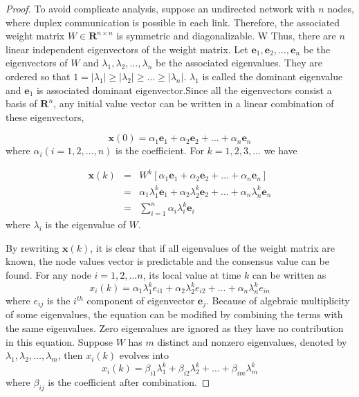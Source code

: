 \begin{proof}
To avoid complicate analysis, suppose an undirected network with $n$
nodes, where duplex communication is possible in each link. Therefore,
the associated weight matrix $W\in\mathbf{R}^{n\times n}$ is symmetric
and diagonalizable. W Thus, there are $n$ linear independent eigenvectors
of the weight matrix. Let $\mathbf{e}_{1},\mathbf{e}_{2},\ldots,\mathbf{e}_{n}$
be the eigenvectors of $W$ and $\lambda_{1},\lambda_{2},\ldots,\lambda_{n}$
be the associated eigenvalues. They are ordered so that $1=\left|\lambda_{1}\right|\geq\left|\lambda_{2}\right|\geq\ldots\geq\left|\lambda_{n}\right|$.
$\lambda_{1}$ is called the dominant eigenvalue and $\mathbf{e}_{1}$
is associated dominant eigenvector.Since all the eigenvectors consist
a basis of $\mathbf{R}^{n}$, any initial value vector can be written
in a linear combination of these eigenvectors, 

\begin{equation}
\mathbf{x}\left(0\right)=\alpha_{1}\mathbf{e}_{1}+\alpha_{2}\mathbf{e}_{2}+\ldots+\alpha_{n}\mathbf{e}_{n}
\end{equation}
where $\alpha_{i}(i=1,2,\ldots,n)$ is the coefficient. For $k=1,2,3,...$
we have

\begin{eqnarray}
\mathbf{x}\left(k\right) & = & W^{k}\left[\alpha_{1}\mathbf{e}_{1}+\alpha_{2}\mathbf{e}_{2}+\ldots+\alpha_{n}\mathbf{e}_{n}\right]\nonumber \\
 & = & \alpha_{1}\lambda_{1}^{k}\mathbf{e}_{1}+\alpha_{2}\lambda_{2}^{k}\mathbf{e}_{2}+\ldots+\alpha_{n}\lambda_{n}^{k}\mathbf{e}_{n}\label{eq:x(k) decomposition}\\
 & = & \sum_{i=1}^{n}\alpha_{i}\lambda_{i}^{k}\mathbf{e}_{i}\nonumber 
\end{eqnarray}
where $\lambda_{i}$ is the eigenvalue of $W$. 

By rewriting $\mathbf{x}\left(k\right)$, it is clear that if all
eigenvalues of the weight matrix are known, the node values vector
is predictable and the consensus value can be found. For any node
$i=1,2,\ldots n$, its local value at time $k$ can be written as
\begin{equation}
x_{i}\left(k\right)=\alpha_{1}\lambda_{1}^{k}e_{i1}+\alpha_{2}\lambda_{2}^{k}e_{i2}+\ldots+\alpha_{n}\lambda_{n}^{k}e_{in}
\end{equation}
where $e_{ij}$ is the $i^{th}$ component of eigenvector $\mathbf{e}_{j}$.
Because of algebraic multiplicity of some eigenvalues, the equation
can be modified by combining the terms with the same eigenvalues.
Zero eigenvalues are ignored as they have no contribution in this
equation. Suppose $W$ has $m$ distinct and nonzero eigenvalues,
denoted by $\lambda_{1},\lambda_{2},\ldots,\lambda_{m}$, then $x_{i}\left(k\right)$
evolves into 
\begin{equation}
x_{i}\left(k\right)=\beta_{i1}\lambda_{1}^{k}+\beta_{i2}\lambda_{2}^{k}+\ldots+\beta_{im}\lambda_{m}^{k}
\end{equation}
where $\beta_{ij}$ is the coefficient after combination. 


\end{proof}
